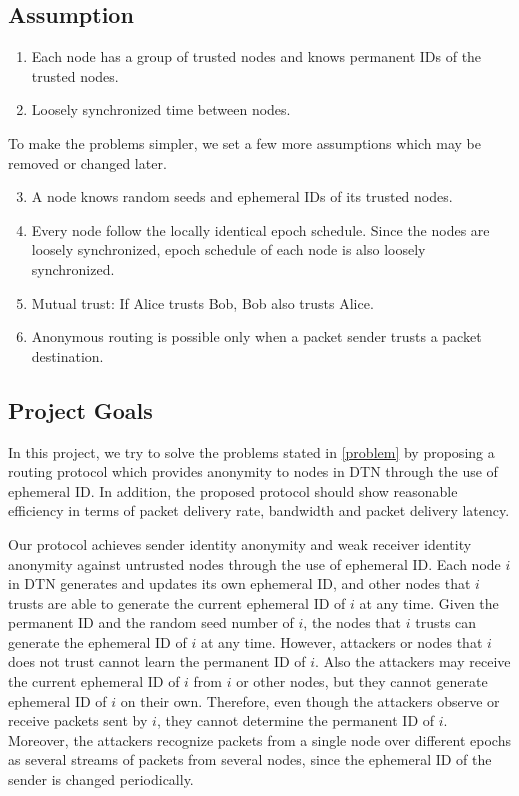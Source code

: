 \documentclass[11pt]{article}
\begin{document}
\subsection{Assumption}
\begin{enumerate}
\item Each node has a group of trusted nodes and knows permanent IDs of the trusted nodes.
\item Loosely synchronized time between nodes.
\end{enumerate}

To make the problems simpler, we set a few more assumptions which may be removed or changed later. 

\begin{enumerate}
\setcounter{enumi}{2}
\item A node knows random seeds and ephemeral IDs of its trusted nodes. 
\item Every node follow the locally identical epoch schedule.  Since the nodes are loosely synchronized, epoch schedule of each node is also loosely synchronized. 
\item Mutual trust: If Alice trusts Bob, Bob also trusts Alice. 
\item Anonymous routing is possible only when a packet sender trusts a packet destination. 
\end{enumerate}


\subsection{Project Goals}
In this project, we try to solve the problems stated in \ref{problem} by proposing a routing protocol which provides anonymity to nodes in DTN through the use of ephemeral ID.  In addition, the proposed protocol should show reasonable efficiency in terms of packet delivery rate, bandwidth and packet delivery latency.  

Our protocol achieves sender identity anonymity and weak receiver identity anonymity against untrusted nodes through the use of ephemeral ID.  
Each node $i$ in DTN generates and updates its own ephemeral ID, and other nodes that $i$ trusts are able to generate the current ephemeral ID of $i$ at any time.  
Given the permanent ID and the random seed number of $i$, the nodes that $i$ trusts can generate the ephemeral ID of $i$ at any time. 
However, attackers or nodes that $i$ does not trust cannot learn the permanent ID of $i$.  
Also the attackers may receive the current ephemeral ID of $i$ from $i$ or other nodes, but they cannot generate ephemeral ID of $i$ on their own.  
Therefore, even though the attackers observe or receive packets sent by $i$, they cannot determine the permanent ID of $i$.  
Moreover, the attackers recognize packets from a single node over different epochs as several streams of packets from several nodes, since the ephemeral ID of the sender is changed periodically. 
\end{document}
